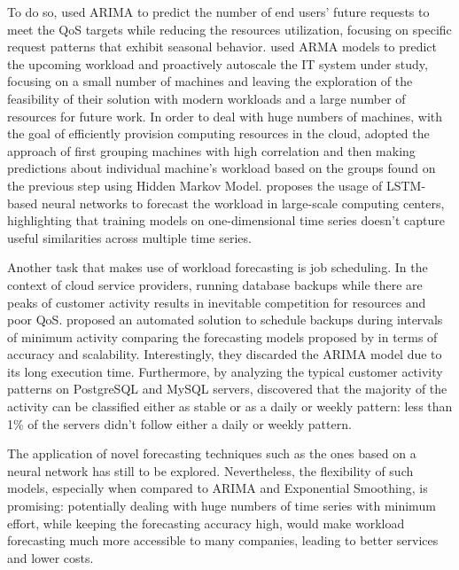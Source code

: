\documentclass[a4paper, 12pt]{article} %
\begin{document}
	To do so, \cite{ArimaWorkloadPrediction} used ARIMA to predict the number of end users' future requests to meet the QoS targets while reducing the resources utilization, focusing on specific request patterns that exhibit seasonal behavior. \cite{ArmaAutoscaling} used ARMA models to predict the upcoming workload and proactively autoscale the IT system under study, focusing on a small number of machines and leaving the exploration of the feasibility of their solution with modern workloads and a large number of resources for future work.
	In order to deal with huge numbers of machines, with the goal of efficiently provision computing resources in the cloud, \cite{WorkloadCharacterizationAndPrediction} adopted the approach of first grouping machines with high correlation and then making predictions about individual machine's workload based on the groups found on the previous step using Hidden Markov Model. 
	\cite{LSTMLargeScaleWorkloadForecasting} proposes the usage of LSTM-based neural networks to forecast the workload in large-scale computing centers, highlighting that training models on one-dimensional time series doesn't capture useful similarities across multiple time series. 
	
	Another task that makes use of workload forecasting is job scheduling. In the context of cloud service providers, running database backups while there are peaks of customer activity results in inevitable competition for resources and poor QoS. \cite{Seagull} proposed an automated solution to schedule backups during intervals of minimum activity comparing the forecasting models proposed by \cite{MicrosoftSSA, GluonTS, FacebookProphet} in terms of accuracy and scalability. Interestingly, they discarded the ARIMA model due to its long execution time. Furthermore, by analyzing the typical customer activity patterns on PostgreSQL and MySQL servers, \cite{Seagull} discovered that the majority of the activity can be classified either as stable or as a daily or weekly pattern: less than 1\% of the servers didn't follow either a daily or weekly pattern.
	
	The application of novel forecasting techniques such as the ones based on a neural network has still to be explored. Nevertheless, the flexibility of such models, especially when compared to ARIMA and Exponential Smoothing, is promising: potentially dealing with huge numbers of time series with minimum effort, while keeping the forecasting accuracy high, would make workload forecasting much more accessible to many companies, leading to better services and lower costs.
	
\end{document}
